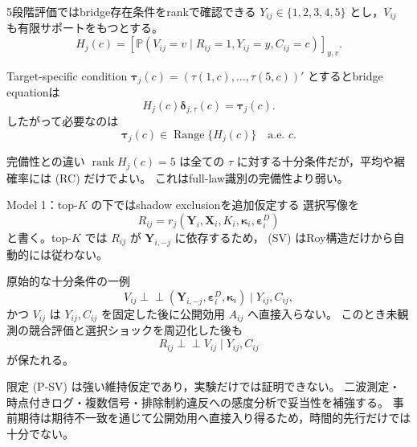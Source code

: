 \documentclass[aspectratio=169,10pt]{beamer}
\newcommand{\Prb}{\mathbb{P}}
\newcommand{\1}{\mathbf{1}}
\newcommand{\indep}{\mathrel{\perp\!\!\!\perp}}
\newcommand{\Y}{\bm{Y}}
\newcommand{\X}{\bm{X}}
\newcommand{\rank}{\operatorname{rank}}
\newcommand{\Range}{\operatorname{Range}}
\begin{document}
\begin{frame}{5段階評価ではbridge存在条件をrankで確認できる}
$Y_{ij}\in\{1,2,3,4,5\}$ とし，$V_{ij}$ も有限サポートをもつとする。
\[
H_j(c)=\left[
\Prb(V_{ij}=v\mid R_{ij}=1,Y_{ij}=y,C_{ij}=c)
\right]_{y,v}.
\]
\begin{block}{Target-specific condition}
\scriptsize
$\bm\tau_j(c)=(\tau(1,c),\ldots,\tau(5,c))'$ とするとbridge equationは
\[
H_j(c)\bm\delta_{j,\tau}(c)=\bm\tau_j(c).
\]
したがって必要なのは
\[
\bm\tau_j(c)\in\Range\{H_j(c)\}\quad\text{a.e. }c.
\tag{RC}
\]
\end{block}
\begin{alertblock}{完備性との違い}
\scriptsize
$\rank H_j(c)=5$ は全ての $\tau$ に対する十分条件だが，平均や裾確率には (RC) だけでよい。
これはfull-law識別の完備性より弱い。
\end{alertblock}
\end{frame}

\begin{frame}[shrink=6]{Model 1：top-$K$ の下ではshadow exclusionを追加仮定する}
選択写像を
\[
R_{ij}=r_j(\Y_i,\X_i,K_i,\bm\kappa_i,\bm\varepsilon_i^D)
\]
と書く。top-$K$ では $R_{ij}$ が $\Y_{i,-j}$ に依存するため，
(SV) はRoy構造だけから自動的には従わない。
\begin{alertblock}{原始的な十分条件の一例}
\scriptsize
\[
V_{ij}\indep
(\Y_{i,-j},\bm\varepsilon_i^D,\bm\kappa_i)
\mid Y_{ij},C_{ij},
\tag{P-SV}
\]
かつ $V_{ij}$ は $Y_{ij},C_{ij}$ を固定した後に公開効用 $A_{ij}$ へ直接入らない。
このとき未観測の競合評価と選択ショックを周辺化した後も
\[
R_{ij}\indep V_{ij}\mid Y_{ij},C_{ij}
\]
が保たれる。
\end{alertblock}
\begin{block}{限定}
\scriptsize
(P-SV) は強い維持仮定であり，実験だけでは証明できない。
二波測定・時点付きログ・複数信号・排除制約違反への感度分析で妥当性を補強する。
事前期待は期待不一致を通じて公開効用へ直接入り得るため，時間的先行だけでは十分でない。
\end{block}
\end{frame}
\end{document}
